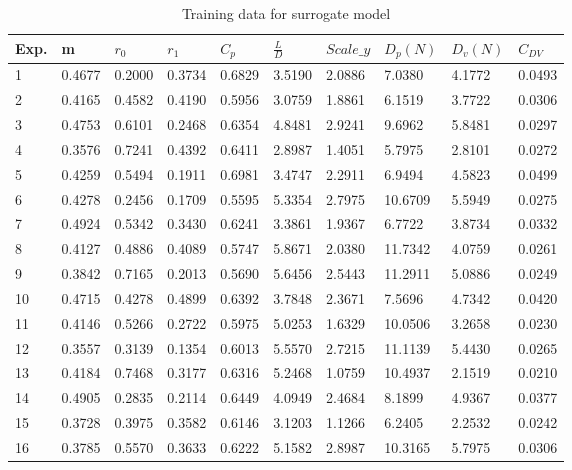 \begin{longtable}{ p{}  p{}  p{}  p{}  p{} p{}  p{} p{} p{} p{}}

\caption{Training data for surrogate model}
\label{Training data for surrogate model}
\\


	\hline
Exp. &	\quad m	&	$ r_{0} $	&	$ r_{1} $	&	$ C_{p} $	&	$ \frac{L}{D} $	&	$ Scale\_y $	&	$ D_{p} (N) $	&	$ D_{v} (N) $	& $ C_{DV} $	\\
\hline
1	&	0.4677	&	0.2000	&	0.3734	&	0.6829	&	3.5190	&	2.0886	&	7.0380	&	4.1772	&	0.0493	\\
2	&	0.4165	&	0.4582	&	0.4190	&	0.5956	&	3.0759	&	1.8861	&	6.1519	&	3.7722	&	0.0306	\\
3	&	0.4753	&	0.6101	&	0.2468	&	0.6354	&	4.8481	&	2.9241	&	9.6962	&	5.8481	&	0.0297	\\
4	&	0.3576	&	0.7241	&	0.4392	&	0.6411	&	2.8987	&	1.4051	&	5.7975	&	2.8101	&	0.0272	\\
5	&	0.4259	&	0.5494	&	0.1911	&	0.6981	&	3.4747	&	2.2911	&	6.9494	&	4.5823	&	0.0499	\\
6	&	0.4278	&	0.2456	&	0.1709	&	0.5595	&	5.3354	&	2.7975	&	10.6709	&	5.5949	&	0.0275	\\
7	&	0.4924	&	0.5342	&	0.3430	&	0.6241	&	3.3861	&	1.9367	&	6.7722	&	3.8734	&	0.0332	\\
8	&	0.4127	&	0.4886	&	0.4089	&	0.5747	&	5.8671	&	2.0380	&	11.7342	&	4.0759	&	0.0261	\\
9	&	0.3842	&	0.7165	&	0.2013	&	0.5690	&	5.6456	&	2.5443	&	11.2911	&	5.0886	&	0.0249	\\
10	&	0.4715	&	0.4278	&	0.4899	&	0.6392	&	3.7848	&	2.3671	&	7.5696	&	4.7342	&	0.0420	\\
11	&	0.4146	&	0.5266	&	0.2722	&	0.5975	&	5.0253	&	1.6329	&	10.0506	&	3.2658	&	0.0230	\\
12	&	0.3557	&	0.3139	&	0.1354	&	0.6013	&	5.5570	&	2.7215	&	11.1139	&	5.4430	&	0.0265	\\
13	&	0.4184	&	0.7468	&	0.3177	&	0.6316	&	5.2468	&	1.0759	&	10.4937	&	2.1519	&	0.0210	\\
14	&	0.4905	&	0.2835	&	0.2114	&	0.6449	&	4.0949	&	2.4684	&	8.1899	&	4.9367	&	0.0377	\\
15	&	0.3728	&	0.3975	&	0.3582	&	0.6146	&	3.1203	&	1.1266	&	6.2405	&	2.2532	&	0.0242	\\
16	&	0.3785	&	0.5570	&	0.3633	&	0.6222	&	5.1582	&	2.8987	&	10.3165	&	5.7975	&	0.0306	\\

\end{longtable}
